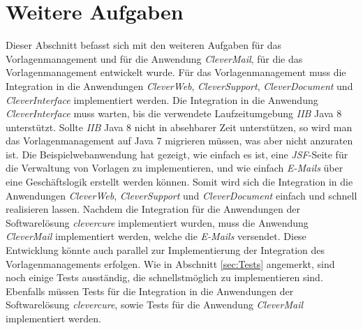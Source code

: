 \section{Weitere Aufgaben}
Dieser Abschnitt befasst sich mit den weiteren Aufgaben für das Vorlagenmanagement und für die Anwendung \emph{CleverMail}, für die das Vorlagenmanagement entwickelt wurde.
\newline
\newline
Für das Vorlagenmanagement muss die Integration in die Anwendungen \emph{CleverWeb}, \emph{CleverSupport}, \emph{CleverDocument} und \emph{CleverInterface} implementiert werden. Die Integration in die Anwendung \emph{CleverInterface} muss warten, bis die verwendete Laufzeitumgebung \emph{IIB} Java 8 unterstützt. Sollte \emph{IIB} Java 8 nicht in absehbarer Zeit unterstützen, so wird man das Vorlagenmanagement auf Java 7 migrieren müssen, was aber nicht anzuraten ist. 
\newline
\newline
Die Beispielwebanwendung hat gezeigt, wie einfach es ist, eine \emph{JSF}-Seite für die Verwaltung von Vorlagen zu implementieren, und wie einfach \emph{E-Mails} über eine Geschäftslogik erstellt werden können. Somit wird sich die Integration in die Anwendungen \emph{CleverWeb}, \emph{CleverSupport} und \emph{CleverDocument} einfach und schnell realisieren lassen.  
\newline
\newline
Nachdem die Integration für die Anwendungen der Softwarelösung \emph{clevercure} implementiert wurden, muss die Anwendung \emph{CleverMail} implementiert werden, welche die \emph{E-Mails} versendet. Diese Entwicklung könnte auch parallel zur Implementierung der Integration des Vorlagenmanagements erfolgen.
\newline
\newline
Wie in Abschnitt \ref{sec:Tests} angemerkt, sind noch einige Tests aus­stän­dig, die schnellstmöglich zu implementieren sind. Ebenfalls müssen Tests für die Integration in die Anwendungen der Softwarelösung \emph{clevercure}, sowie Tests für die Anwendung \emph{CleverMail} implementiert werden. 

